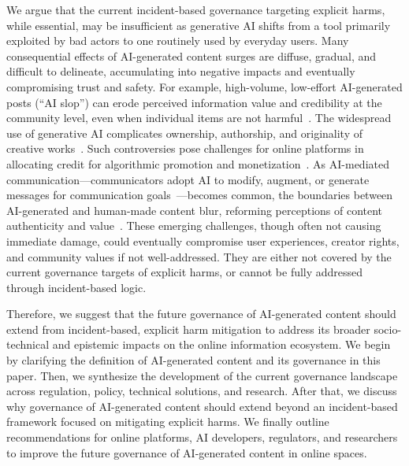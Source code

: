 We argue that the current incident-based governance targeting explicit harms, while essential, may be insufficient as generative AI shifts from a tool primarily exploited by bad actors to one routinely used by everyday users. Many consequential effects of AI-generated content surges are diffuse, gradual, and difficult to delineate, accumulating into negative impacts and eventually compromising trust and safety. For example, high-volume, low-effort AI-generated posts (``AI slop'') can erode perceived information value and credibility at the community level, even when individual items are not harmful~\cite{Gross2025AISlopAP, mahdawi2025slop, hoffman2024first}. The widespread use of generative AI complicates ownership, authorship, and originality of creative works~\cite{10.1145/3706598.3713522,kyi2025governance}. Such controversies pose challenges for online platforms in allocating credit for algorithmic promotion and monetization~\cite{cosen2024new}. As AI-mediated communication---communicators adopt AI to modify, augment, or generate messages for communication goals~\cite{hancock2020ai}---becomes common, the boundaries between AI-generated and human-made content blur, reforming perceptions of content authenticity and value~\cite{Gross2025AISlopAP, eissa2025influence}. These emerging challenges, though often not causing immediate damage, could eventually compromise user experiences, creator rights, and community values if not well-addressed. They are either not covered by the current governance targets of explicit harms, or cannot be fully addressed through incident-based logic. 

Therefore, we suggest that the future governance of AI-generated content should extend from incident-based, explicit harm mitigation to address its broader socio-technical and epistemic impacts on the online information ecosystem. We begin by clarifying the definition of AI-generated content and its governance in this paper. Then, we synthesize the development of the current governance landscape across regulation, policy, technical solutions, and research. After that, we discuss why governance of AI-generated content should extend beyond an incident-based framework focused on mitigating explicit harms. We finally outline recommendations for online platforms, AI developers, regulators, and researchers to improve the future governance of AI-generated content in online spaces.

